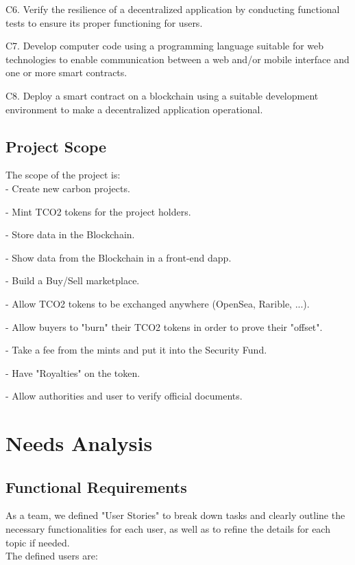 \documentclass[a4paper, 12pt]{article}
\begin{document}
C6. Verify the resilience of a decentralized application by conducting functional tests to ensure its proper functioning for users.

C7. Develop computer code using a programming language suitable for web technologies to enable communication between a web and/or mobile interface and one or more smart contracts.

C8. Deploy a smart contract on a blockchain using a suitable development environment to make a decentralized application operational.

\subsection{Project Scope}

The scope of the project is:\\

- Create new carbon projects.

- Mint TCO2 tokens for the project holders.

- Store data in the Blockchain.

- Show data from the Blockchain in a front-end dapp.

- Build a Buy/Sell marketplace.

- Allow TCO2 tokens to be exchanged anywhere (OpenSea, Rarible, ...).

- Allow buyers to "burn" their TCO2 tokens in order to prove their "offset".

- Take a fee from the mints and put it into the Security Fund.

- Have "Royalties" on the token.

- Allow authorities and user to verify official documents.


\section{Needs Analysis}

\subsection{Functional Requirements}

As a team, we defined "User Stories" to break down tasks and clearly outline the necessary functionalities for each user, as well as to refine the details for each topic if needed.\\

The defined users are:\\
\end{document}
